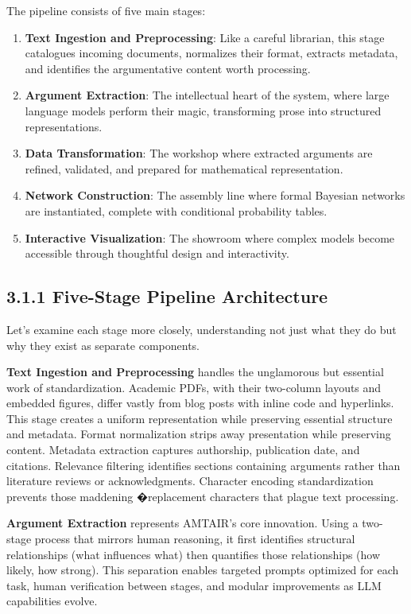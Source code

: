 \documentclass[
  11pt,
  letterpaper,
]{book}
\providecommand{\tightlist}{%
  \setlength{\itemsep}{0pt}\setlength{\parskip}{0pt}}
\begin{document}
The pipeline consists of five main stages:

\begin{enumerate}
\def\labelenumi{\arabic{enumi}.}
\tightlist
\item
  \textbf{Text Ingestion and Preprocessing}: Like a careful librarian,
  this stage catalogues incoming documents, normalizes their format,
  extracts metadata, and identifies the argumentative content worth
  processing.
\item
  \textbf{Argument Extraction}: The intellectual heart of the system,
  where large language models perform their magic, transforming prose
  into structured representations.
\item
  \textbf{Data Transformation}: The workshop where extracted arguments
  are refined, validated, and prepared for mathematical representation.
\item
  \textbf{Network Construction}: The assembly line where formal Bayesian
  networks are instantiated, complete with conditional probability
  tables.
\item
  \textbf{Interactive Visualization}: The showroom where complex models
  become accessible through thoughtful design and interactivity.
\end{enumerate}

\subsection{3.1.1 Five-Stage Pipeline
Architecture}\label{sec-five-stage-pipeline}

Let's examine each stage more closely, understanding not just what they
do but why they exist as separate components.

\textbf{Text Ingestion and Preprocessing} handles the unglamorous but
essential work of standardization. Academic PDFs, with their two-column
layouts and embedded figures, differ vastly from blog posts with inline
code and hyperlinks. This stage creates a uniform representation while
preserving essential structure and metadata. Format normalization strips
away presentation while preserving content. Metadata extraction captures
authorship, publication date, and citations. Relevance filtering
identifies sections containing arguments rather than literature reviews
or acknowledgments. Character encoding standardization prevents those
maddening �replacement characters that plague text processing.

\textbf{Argument Extraction} represents AMTAIR's core innovation. Using
a two-stage process that mirrors human reasoning, it first identifies
structural relationships (what influences what) then quantifies those
relationships (how likely, how strong). This separation enables targeted
prompts optimized for each task, human verification between stages, and
modular improvements as LLM capabilities evolve.
\end{document}
